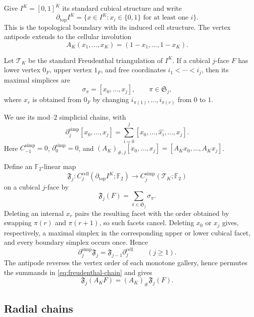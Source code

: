 \documentclass[reqno,12pt]{amsart}
\theoremstyle{definition}
\newcommand{\F}{\mathbb F_2}
\newcommand{\cell}{\mathrm{cell}}
\begin{document}
Give \(I^K=[0,1]^K\) its standard cubical structure and write
\[
 \partial_{\mathrm{top}}I^K
 =\{x\in I^K:x_i\in\{0,1\}\text{ for at least one }i\}.
\]
This is the topological boundary with its induced cell structure.  The
vertex antipode extends to the cellular involution
\[
 A_K(x_1,\ldots,x_K)=(1-x_1,\ldots,1-x_K).
\]

Let \({\mathcal T}_K\) be the standard Freudenthal
triangulation of \(I^K\). If a cubical \(j\)-face \(F\) has lower vertex
\(0_F\), upper vertex \(1_F\), and free coordinates
\(i_1<\cdots<i_j\), then its maximal simplices are
\[
 \sigma_\pi=[x_0,\ldots,x_j],
 \qquad \pi\in\mathfrak S_j,
\]
where \(x_r\) is obtained from \(0_F\) by changing
\(i_{\pi(1)},\ldots,i_{\pi(r)}\) from \(0\) to \(1\).

We use its
mod--\(2\) simplicial chains, with
\[
 \partial_j^{\mathrm{simp}}[x_0,\ldots,x_j]
 =\sum_{i=0}^j[x_0,\ldots,\widehat{x_i},\ldots,x_j].
\]
Here \(C_{-1}^{\mathrm{simp}}=0\), \(\partial_0^{\mathrm{simp}}=0\),
and
\((A_K)_{\#,j}[x_0,\ldots,x_j]=[A_Kx_0,\ldots,A_Kx_j]\).

Define an \(\F\)-linear map
\[
 \mathfrak F_j:
 C_j^{\cell}(\partial_{\mathrm{top}}I^K;\F)
 \longrightarrow C_j^{\mathrm{simp}}(\mathcal T_K;\F)
\]
on a cubical \(j\)-face by
\begin{equation}\label{eq:freudenthal-chain}
 \mathfrak F_j(F)=\sum_{\pi\in\mathfrak S_j}\sigma_\pi.
\end{equation}
Deleting an internal \(x_r\) pairs the resulting facet with the order
obtained by swapping \(\pi(r)\) and \(\pi(r+1)\), so such facets cancel.
Deleting \(x_0\) or \(x_j\) gives, respectively, a maximal simplex in
the corresponding upper or lower cubical facet, and every boundary
simplex occurs once.  Hence
\begin{equation}\label{eq:freudenthal-boundary}
 \partial_j^{\mathrm{simp}}\mathfrak F_j
 =\mathfrak F_{j-1}\partial_j^{\cell}\qquad(j\geq1).
\end{equation}
The antipode reverses the vertex order of each monotone gallery, hence
permutes the summands in \eqref{eq:freudenthal-chain} and gives
\begin{equation}\label{eq:freudenthal-equivariance}
 \mathfrak F_j(A_KF)=(A_K)_\#\mathfrak F_j(F).
\end{equation}

\subsection{Radial chains}
\end{document}
